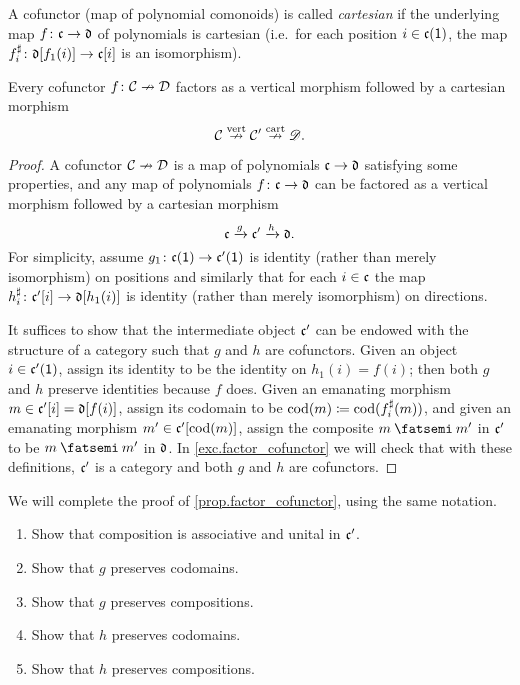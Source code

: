 \documentclass[DynamicalBook]{subfiles}
\begin{document}
A cofunctor (map of polynomial comonoids) is called \emph{cartesian} if the underlying map $f\colon \mathfrak{c}\to \mathfrak{d}$ of polynomials is cartesian (i.e.\ for each position $i\in \mathfrak{c}(\textsf{1})$, the map $f^\sharp_i\colon\mathfrak{d}[f_1(i)]\to\mathfrak{c}[i]$ is an isomorphism).

\begin{proposition}\label{prop.factor_cofunctor}
Every cofunctor $f\colon\mathcal{C}\nrightarrow\mathcal{D}$ factors as a vertical morphism followed by a cartesian morphism
\[
\mathcal{C}\overset{\text{vert}}{\nrightarrow}\mathcal{C}'\overset{\text{cart}}{\nrightarrow}\mathscr{D}.
\]
\end{proposition}
\begin{proof}
A cofunctor $\mathcal{C}\nrightarrow\mathcal{D}$ is a map of polynomials $\mathfrak{c}\to\mathfrak{d}$ satisfying some properties, and any map of polynomials $f\colon\mathfrak{c}\to\mathfrak{d}$ can be factored as a vertical morphism followed by a cartesian morphism
\[
	\mathfrak{c}\xrightarrow{g}\mathfrak{c'}\xrightarrow{h}\mathfrak{d}.
\]
For simplicity, assume $g_1\colon\mathfrak{c}(\textsf{1})\to\mathfrak{c}'(\textsf{1})$ is identity (rather than merely isomorphism) on positions and similarly that for each $i\in\mathfrak{c}$ the map $h^\sharp_i\colon\mathfrak{c}'[i]\to\mathfrak{d}[h_1(i)]$ is identity (rather than merely isomorphism) on directions. 

It suffices to show that the intermediate object $\mathfrak{c'}$ can be endowed with the structure of a category such that $g$ and $h$ are cofunctors. Given an object $i\in\mathfrak{c}'(\textsf{1})$, assign its identity to be the identity on $h_1(i)=f(i)$; then both $g$ and $h$ preserve identities because $f$ does. Given an emanating morphism $m\in\mathfrak{c}'[i]=\mathfrak{d}[f(i)]$, assign its codomain to be $\operatorname{cod}(m)\coloneqq\operatorname{cod}(f^\sharp_i(m))$, and given an emanating morphism $m'\in\mathfrak{c}'[\operatorname{cod}(m)]$, assign the composite $m\then m'$ in $\mathfrak{c}'$ to be $m\then m'$ in $\mathfrak{d}$. In \cref{exc.factor_cofunctor} we will check that with these definitions, $\mathfrak{c}'$ is a category and both $g$ and $h$ are cofunctors.
\end{proof}

\begin{exercise}\label{exc.factor_cofunctor}
We will complete the proof of \cref{prop.factor_cofunctor}, using the same notation.
\begin{enumerate}
	\item Show that composition is associative and unital in $\mathfrak{c}'$.
	\item Show that $g$ preserves codomains.
	\item Show that $g$ preserves compositions.
	\item Show that $h$ preserves codomains.
	\item Show that $h$ preserves compositions.
\qedhere
\end{enumerate}
\end{exercise}
\end{document}
